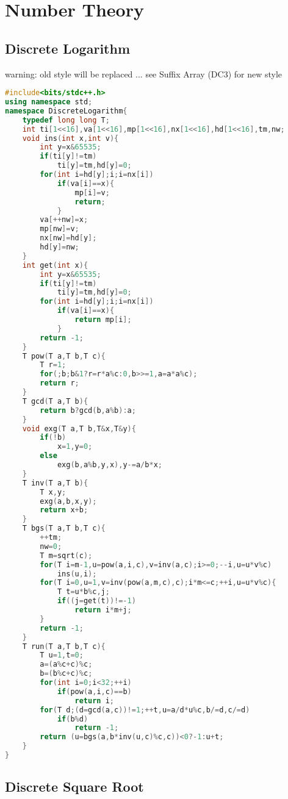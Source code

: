 \documentclass{book}
\begin{document}
\chapter{Number Theory}
\newpage
{}
\section{Discrete Logarithm}
warning: old style will be replaced ... see Suffix Array (DC3) for new style\begin{lstlisting}[language=C++,title={Discrete Logarithm.hpp (1819 bytes, 74 lines)}]
#include<bits/stdc++.h>
using namespace std;
namespace DiscreteLogarithm{
    typedef long long T;
    int ti[1<<16],va[1<<16],mp[1<<16],nx[1<<16],hd[1<<16],tm,nw;
    void ins(int x,int v){
        int y=x&65535;
        if(ti[y]!=tm)
            ti[y]=tm,hd[y]=0;
        for(int i=hd[y];i;i=nx[i])
            if(va[i]==x){
                mp[i]=v;
                return;
            }
        va[++nw]=x;
        mp[nw]=v;
        nx[nw]=hd[y];
        hd[y]=nw;
    }
    int get(int x){
        int y=x&65535;
        if(ti[y]!=tm)
            ti[y]=tm,hd[y]=0;
        for(int i=hd[y];i;i=nx[i])
            if(va[i]==x){
                return mp[i];
            }
        return -1;
    }
    T pow(T a,T b,T c){
        T r=1;
        for(;b;b&1?r=r*a%c:0,b>>=1,a=a*a%c);
        return r;
    }
    T gcd(T a,T b){
        return b?gcd(b,a%b):a;
    }
    void exg(T a,T b,T&x,T&y){
        if(!b)
            x=1,y=0;
        else
            exg(b,a%b,y,x),y-=a/b*x;
    }
    T inv(T a,T b){
        T x,y;
        exg(a,b,x,y);
        return x+b;
    }
    T bgs(T a,T b,T c){
        ++tm;
        nw=0;
        T m=sqrt(c);
        for(T i=m-1,u=pow(a,i,c),v=inv(a,c);i>=0;--i,u=u*v%c)
            ins(u,i);
        for(T i=0,u=1,v=inv(pow(a,m,c),c);i*m<=c;++i,u=u*v%c){
            T t=u*b%c,j;
            if((j=get(t))!=-1)
                return i*m+j;
        }
        return -1;
    }
    T run(T a,T b,T c){
        T u=1,t=0;
        a=(a%c+c)%c;
        b=(b%c+c)%c;
        for(int i=0;i<32;++i)
            if(pow(a,i,c)==b)
                return i;
        for(T d;(d=gcd(a,c))!=1;++t,u=a/d*u%c,b/=d,c/=d)
            if(b%d)
                return -1;
        return (u=bgs(a,b*inv(u,c)%c,c))<0?-1:u+t;
    }
}
\end{lstlisting}
\section{Discrete Square Root}
\end{document}

